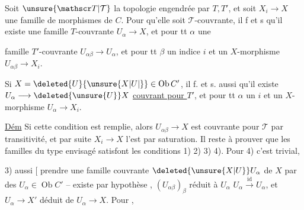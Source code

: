 Soit $\unsure{\mathscr T|\mathcal T}$ la topologie engendrée par $T,T'$,  et soit $X_i\longrightarrow X$ une famille de morphismes de $C$. Pour qu'elle soit $\mathscr T$-couvrante, il f et s qu'il existe une famille $T$-couvrante $U_\alpha\longrightarrow X$,  et pour tt $\alpha$ une


famille $T'$-couvrante $U_{\alpha\beta}\longrightarrow U_\alpha$, et pour tt $\beta$ un indice $i$ et un $X$-morphisme $U_{\alpha\beta}\longrightarrow X_i$.

 Si $X=\deleted{U}{\unsure{X|U|{}}}\in\operatorname{Ob}C'$, il f. et s. aussi qu'il existe $U_\alpha\longrightarrow\deleted{\unsure{U}}X$ \uline{couvrant pour $T'$},  et pour tt $\alpha$ un $i$  et un $X$-morphisme $U_\alpha\longrightarrow X_i$.


\uline{Dém} Si cette condition est remplie, alors $U_{\alpha\beta}\longrightarrow X$ est couvrante pour $\mathscr T$ par transitivité, et par suite $X_i\longrightarrow X$ l'est par saturation. Il reste à prouver que les familles du type envisagé satisfont les conditions 1) 2) 3) 4). Pour 4) c'est trivial,

 3) aussi [ prendre une famille couvrante $\deleted{\unsure{X|U}}U_\alpha$ de $X$ par des $U_\alpha\in\operatorname{Ob}C'$ -- existe par hypothèse  , $(U_{\alpha\beta})_\beta$ réduit à $U_\alpha$ \unsure{---} $U_\alpha\xrightarrow{\mathrm{id}}U_\alpha$, et $U_\alpha\longrightarrow X'$ déduit de $U_\alpha\longrightarrow X$. Pour ,

